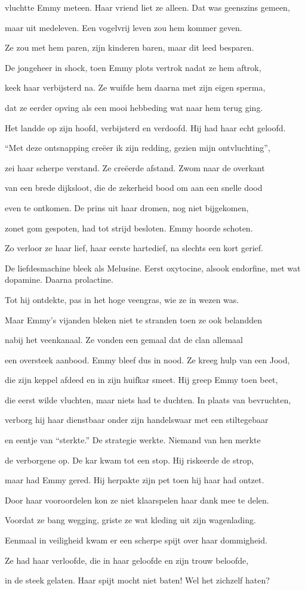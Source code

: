 vluchtte Emmy meteen.
Haar vriend liet ze alleen.
Dat was geenszins gemeen,

maar uit medeleven.
Een vogelvrij leven
zou hem kommer geven.

Ze zou met hem paren,
zijn kinderen baren,
maar dit leed besparen.

De jongeheer in shock,
toen Emmy plots vertrok
nadat ze hem aftrok,

keek haar verbijsterd na.
Ze wuifde hem daarna
met zijn eigen sperma,

dat ze eerder opving
als een mooi hebbeding
wat naar hem terug ging.

Het landde op zijn hoofd,
verbijsterd en verdoofd.
Hij had haar echt geloofd.

“Met deze ontsnapping
creëer ik zijn redding,
gezien mijn ontvluchting”,

zei haar scherpe verstand.
Ze creëerde afstand.
Zwom naar de overkant

van een brede dijksloot,
die de zekerheid bood
om aan een snelle dood

even te ontkomen.
De prins uit haar dromen,
nog niet bijgekomen,

zonet gom gespoten,
had tot strijd besloten.
Emmy hoorde schoten.

Zo verloor ze haar lief,
haar eerste hartedief,
na slechts een kort gerief.

De liefdesmachine
bleek als Melusine.
Eerst oxytocine,
alsook endorfine,
met wat dopamine.
Daarna prolactine.

Tot hij ontdekte, pas
in het hoge veengras,
wie ze in wezen was.

Maar Emmy’s vijanden
bleken niet te stranden
toen ze ook belandden

nabij het veenkanaal.
Ze vonden een gemaal
dat de clan allemaal

een oversteek aanbood.
Emmy bleef dus in nood.
Ze kreeg hulp van een Jood,

die zijn keppel afdeed
en in zijn huifkar smeet.
Hij greep Emmy toen beet,

die eerst wilde vluchten,
maar niets had te duchten.
In plaats van bevruchten,

verborg hij haar dienstbaar
onder zijn handelswaar
met een stiltegebaar

en eentje van “sterkte.”
De strategie werkte.
Niemand van hen merkte

de verborgene op.
De kar kwam tot een stop.
Hij riskeerde de strop,

maar had Emmy gered.
Hij herpakte zijn pet
toen hij haar had ontzet.

Door haar vooroordelen
kon ze niet klaarspelen
haar dank mee te delen.

Voordat ze bang wegging,
griste ze wat kleding
uit zijn wagenlading.

Eenmaal in veiligheid
kwam er een scherpe spijt
over haar dommigheid.

Ze had haar verloofde,
die in haar geloofde
en zijn trouw beloofde,

in de steek gelaten.
Haar spijt mocht niet baten!
Wel het zichzelf haten?
